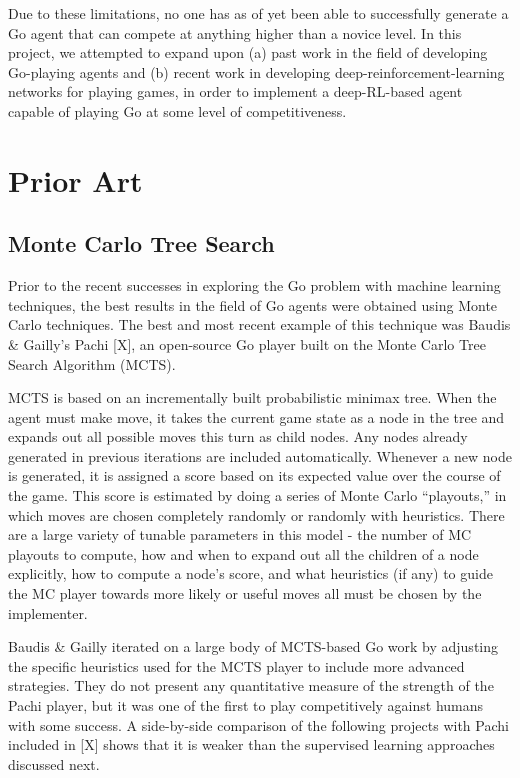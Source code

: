 Due to these limitations, no one has as of yet been able to successfully generate a Go agent that can compete at anything higher than a novice level. In this project, we attempted to expand upon (a) past work in the field of developing Go-playing agents and (b) recent work in developing deep-reinforcement-learning networks for playing games, in order to implement a deep-RL-based agent capable of playing Go at some level of competitiveness.

\section{Prior Art}
\label{gen_inst}

\subsection*{Monte Carlo Tree Search}
Prior to the recent successes in exploring the Go problem with machine learning techniques, the best results in the field of Go agents were obtained using Monte Carlo techniques. The best and most recent example of this technique was Baudis \& Gailly's Pachi [X], an open-source Go player built on the Monte Carlo Tree Search Algorithm (MCTS).

MCTS is based on an incrementally built probabilistic minimax tree. When the agent must make move, it takes the current game state as a node in the tree and expands out all possible moves this turn as child nodes. Any nodes already generated in previous iterations are included automatically. Whenever a new node is generated, it is assigned a score based on its expected value over the course of the game. This score is estimated by doing a series of Monte Carlo ``playouts,'' in which moves are chosen completely randomly or randomly with heuristics. There are a large variety of tunable parameters in this model - the number of MC playouts to compute, how and when to expand out all the children of a node explicitly, how to compute a node's score, and what heuristics (if any) to guide the MC player towards more likely or useful moves all must be chosen by the implementer.

Baudis \& Gailly iterated on a large body of MCTS-based Go work by adjusting the specific heuristics used for the MCTS player to include more advanced strategies. They do not present any quantitative measure of the strength of the Pachi player, but it was one of the first to play competitively against humans with some success. A side-by-side comparison of the following projects with Pachi included in [X] shows that it is weaker than the supervised learning approaches discussed next.

